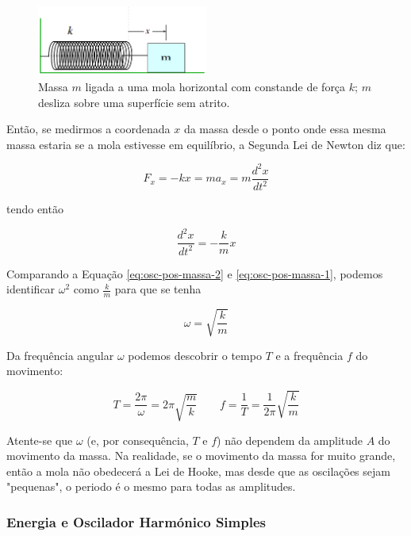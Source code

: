 \begin{figure}[h!]
    \centering
    \includegraphics[width=0.5\textwidth]{10/fig/sistema.png}
    \caption{Massa $m$ ligada a uma mola horizontal com constande de força $k$; $m$ desliza sobre uma superfície sem atrito.}
\end{figure}

Então, se medirmos a coordenada $x$ da massa desde o ponto onde essa mesma massa estaria se a mola estivesse em equilíbrio, a Segunda Lei de Newton diz que:

\begin{equation*}\label{eq:osc-pos-massa-2}
    F_x=-kx=ma_x=m\frac{d^2x}{dt^2}
\end{equation*}

tendo então

\begin{equation}
    \frac{d^2x}{dt^2}=-\frac{k}{m}x
\end{equation}

Comparando a Equação \ref{eq:osc-pos-massa-2} e \ref{eq:osc-pos-massa-1}, podemos identificar $\omega^2$ como $\frac{k}{m}$ para que se tenha

\begin{equation}
    \omega=\sqrt{\frac{k}{m}}
\end{equation}

Da frequência angular $\omega$ podemos descobrir o tempo $T$ e a frequência $f$ do movimento:

\begin{equation}
    T=\frac{2\pi}{\omega}=2\pi\sqrt{\frac{m}{k}} \qquad f=\frac{1}{T}=\frac{1}{2\pi}\sqrt{\frac{k}{m}}
\end{equation}

Atente-se que $\omega$ (e, por consequência, $T$ e $f$) não dependem da amplitude $A$ do movimento da massa. Na realidade, se o movimento da massa for muito grande, então a mola não obedecerá a Lei de Hooke, mas desde que as oscilações sejam "pequenas", o periodo é o mesmo para todas as amplitudes.

\subsubsection{Energia e Oscilador Harmónico Simples}

